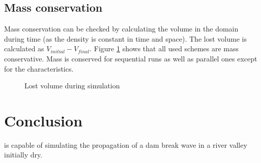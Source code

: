 \subsection{Mass conservation}

Mass conservation can be checked by calculating the volume in the domain during time (as the density is constant in time and space). The lost volume is calculated as $V_{initial} - V_{final}$.
Figure \ref{fig:malpasset:lostvol} shows that all used schemes are mass conservative. Mass is conserved for sequential runs as well as parallel ones except for the characteristics.

\begin{figure}[H]
\centering
{}
\caption{Lost volume during simulation}
\label{fig:malpasset:lostvol}
\end{figure}

\section{Conclusion}
 is capable of simulating the propagation of a dam break wave in a river valley initially dry.

